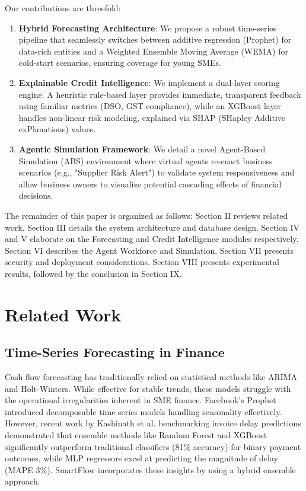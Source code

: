 \documentclass[conference]{IEEEtran}
\begin{document}
Our contributions are threefold:
\begin{enumerate}
    \item \textbf{Hybrid Forecasting Architecture}: We propose a robust time-series pipeline that seamlessly switches between additive regression (Prophet) for data-rich entities and a Weighted Ensemble Moving Average (WEMA) for cold-start scenarios, ensuring coverage for young SMEs.
    \item \textbf{Explainable Credit Intelligence}: We implement a dual-layer scoring engine. A heuristic rule-based layer provides immediate, transparent feedback using familiar metrics (DSO, GST compliance), while an XGBoost layer handles non-linear risk modeling, explained via SHAP (SHapley Additive exPlanations) values.
    \item \textbf{Agentic Simulation Framework}: We detail a novel Agent-Based Simulation (ABS) environment where virtual agents re-enact business scenarios (e.g., "Supplier Risk Alert") to validate system responsiveness and allow business owners to visualize potential cascading effects of financial decisions.
\end{enumerate}

The remainder of this paper is organized as follows: Section II reviews related work. Section III details the system architecture and database design. Section IV and V elaborate on the Forecasting and Credit Intelligence modules respectively. Section VI describes the Agent Workforce and Simulation. Section VII presents security and deployment considerations. Section VIII presents experimental results, followed by the conclusion in Section IX.

\section{Related Work}

\subsection{Time-Series Forecasting in Finance}
Cash flow forecasting has traditionally relied on statistical methods like ARIMA and Holt-Winters. While effective for stable trends, these models struggle with the operational irregularities inherent in SME finance. Facebook's Prophet \cite{prophet} introduced decomposable time-series models handling seasonality effectively. However, recent work by Kashinath et al. \cite{kashinath2023} benchmarking invoice delay predictions demonstrated that ensemble methods like Random Forest and XGBoost significantly outperform traditional classifiers (81\% accuracy) for binary payment outcomes, while MLP regressors excel at predicting the magnitude of delay (MAPE 3\%). SmartFlow incorporates these insights by using a hybrid ensemble approach.
\end{document}
